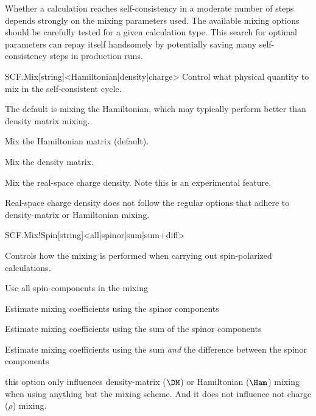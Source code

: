 Whether a calculation reaches self-consistency in a moderate number of
steps depends strongly on the mixing parameters used. The available
mixing options should be carefully tested for a given calculation
type. This search for optimal parameters can repay itself handsomely
by potentially saving many self-consistency steps in production runs.


\begin{fdfentry}{SCF.Mix}[string]<Hamiltonian|density|charge>
  Control what physical quantity to mix in the self-consistent cycle.

  The default is mixing the Hamiltonian, which may typically perform
  better than density matrix mixing. 

  \begin{fdfoptions}
    \option[Hamiltonian]%
    Mix the Hamiltonian matrix (default).

    \option[density]%
    Mix the density matrix.

    \option[charge]%
    Mix the real-space charge density. Note this is an experimental
    feature.
    
  \end{fdfoptions}
  
  \note Real-space charge density does not follow the regular options
  that adhere to density-matrix or Hamiltonian mixing.

\end{fdfentry}

\begin{fdfentry}{SCF.Mix!Spin}[string]<all|spinor|sum|sum+diff>

  Controls how the mixing is performed when carrying out
  spin-polarized calculations.
  
  \begin{fdfoptions}
    \option[all] %
    Use all spin-components in the mixing

    \option[spinor] %
    Estimate mixing coefficients using the spinor components

    \option[sum] %
    Estimate mixing coefficients using the sum of the spinor
    components 

    Estimate mixing coefficients using the sum \emph{and} the
    difference between the spinor components 
  \end{fdfoptions}

  \note this option only influences density-matrix ($\DM$) or
  Hamiltonian ($\Ham$) mixing when using anything but the
   mixing scheme. And it does not influence not charge
  ($\rho$) mixing.
  
\end{fdfentry}

